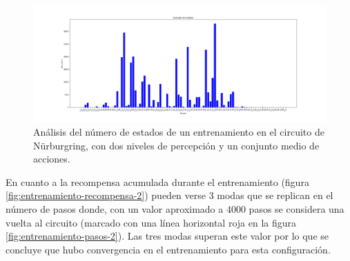 \begin{figure}[!ht]
    \centering \includegraphics[width=1\columnwidth]{./figures/chapter_5/nurburgring_medium_1.png}
    \caption{Análisis del número de estados de un entrenamiento en el circuito de Nürburgring, con dos niveles de percepción y un conjunto medio de acciones.}\label{fig:entrenamiento-2}
\end{figure}

En cuanto a la recompensa acumulada durante el entrenamiento (figura \ref{fig:entrenamiento-recompensa-2}) pueden verse 3 modas que se replican en el número de pasos donde, con un valor aproximado a $4000$ pasos se considera una vuelta al circuito (marcado con una línea horizontal roja en la figura \ref{fig:entrenamiento-pasos-2}). Las tres modas superan este valor por lo que se concluye que hubo convergencia en el entrenamiento para esta configuración.

